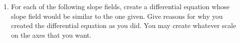 \begin{enumerate}
\item For each of the following slope fields, create a differential equation whose slope field would be similar to the one given. Give reasons for why you created the differential equation as you did. You may create whatever scale on the axes that you want. \label{04HWproblem2} \\
\end{enumerate}

